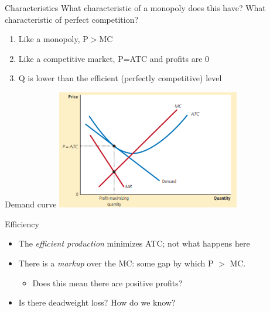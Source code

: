 \documentclass[aspectratio=169]{beamer}
\begin{document}
\begin{frame}{Characteristics}
    What characteristic of a monopoly does this have? What characteristic of perfect competition?
    \begin{enumerate}
        \item Like a monopoly, P$>$MC
        \item Like a competitive market, P=ATC and profits are 0
        \item Q is lower than the efficient (perfectly competitive) level
    \end{enumerate}
\end{frame}

\begin{frame}{Demand curve}
    \centering
    \includegraphics[width = 0.6\textwidth,keepaspectratio]{../figs/MCeq.png}
\end{frame}

\begin{frame}{Efficiency}
    \begin{itemize}
        \item The \textit{efficient production} minimizes ATC; not what happens here
        \item There is a \textit{markup} over the MC: some gap by which P $>$ MC.
        \begin{itemize}
            \item Does this mean there are positive profits?
        \end{itemize} 
        \item Is there deadweight loss? How do we know?
    \end{itemize}
\end{frame}
\end{document}
